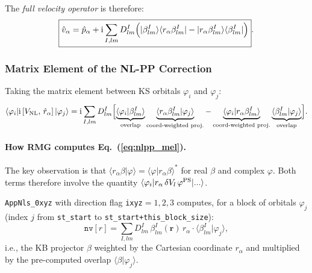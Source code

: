 \documentclass[12pt,letterpaper]{article}
\newcommand{\bra}[1]{\langle #1 \rvert}
\newcommand{\ket}[1]{\lvert #1 \rangle}
\newcommand{\braket}[2]{\langle #1 \vert #2 \rangle}
\newcommand{\mel}[3]{\langle #1 \vert #2 \vert #3 \rangle}
\newcommand{\comm}[2]{\left[ #1,\, #2 \right]}
\newcommand{\ii}{\mathrm{i}}
\newcommand{\VNL}{V_{\rm NL}}
\newcommand{\psiPS}{\varphi^{\rm PS}}
\begin{document}
The \emph{full velocity operator} is therefore:
\begin{equation}
  \boxed{\hat{v}_\alpha = \hat{p}_\alpha
  + \ii\sum_{I,lm} D^I_{lm}
    \Bigl(\ket{\beta^I_{lm}}\bra{r_\alpha\beta^I_{lm}}
         - \ket{r_\alpha\beta^I_{lm}}\bra{\beta^I_{lm}}\Bigr)}.
  \label{eq:full_velocity}
\end{equation}

\subsubsection{Matrix Element of the NL-PP Correction}

Taking the matrix element between KS orbitals $\varphi_i$ and $\varphi_j$:
\begin{equation}
  \mel{\varphi_i}{\ii\comm{\VNL}{\hat{r}_\alpha}}{\varphi_j}
  = \ii\sum_{I,lm} D^I_{lm}
    \Bigl[
      \underbrace{\braket{\varphi_i}{\beta^I_{lm}}}_{\text{overlap}}
      \underbrace{\braket{r_\alpha\beta^I_{lm}}{\varphi_j}}_{\text{coord-weighted proj.}}
      -
      \underbrace{\braket{\varphi_i}{r_\alpha\beta^I_{lm}}}_{\text{coord-weighted proj.}}
      \underbrace{\braket{\beta^I_{lm}}{\varphi_j}}_{\text{overlap}}
    \Bigr].
  \label{eq:nlpp_mel}
\end{equation}

\paragraph{How RMG computes Eq.~(\ref{eq:nlpp_mel}).}
The key observation is that $\braket{r_\alpha\beta}{\varphi} = \braket{\varphi}{r_\alpha\beta}^*$
for real $\beta$ and complex $\varphi$.  Both terms therefore involve the
quantity $\mel{\varphi_i}{r_\alpha\,\delta V_l\,\psiPS}{...}$.

\texttt{AppNls\_0xyz} with direction flag \texttt{ixyz}$=1,2,3$ computes, for
a block of orbitals $\varphi_j$ (index $j$ from \texttt{st\_start} to
\texttt{st\_start+this\_block\_size}):
\begin{equation}
  \texttt{nv}[r] = \sum_{I,lm} D^I_{lm}\,\beta^I_{lm}(\bm{r})\,r_\alpha
  \cdot \braket{\beta^I_{lm}}{\varphi_j},
  \label{eq:appnls0xyz}
\end{equation}
i.e., the KB projector $\beta$ weighted by the Cartesian coordinate $r_\alpha$
and multiplied by the pre-computed overlap $\braket{\beta}{\varphi_j}$.
\end{document}
